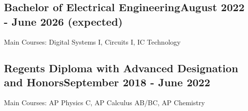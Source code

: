 \vspace*{10pt}


\subsection{{Bachelor of Electrical Engineering}\hfill August 2022 - June 2026 (expected)}
\vspace*{5pt}
Main Courses: Digital Systems I, Circuits I, IC Technology

\vspace*{6pt}

\subsection{{Regents Diploma with Advanced Designation and Honors}\hfill September 2018 - June 2022}
\vspace*{5pt}
Main Courses: AP Physics C, AP Calculus AB/BC, AP Chemistry
